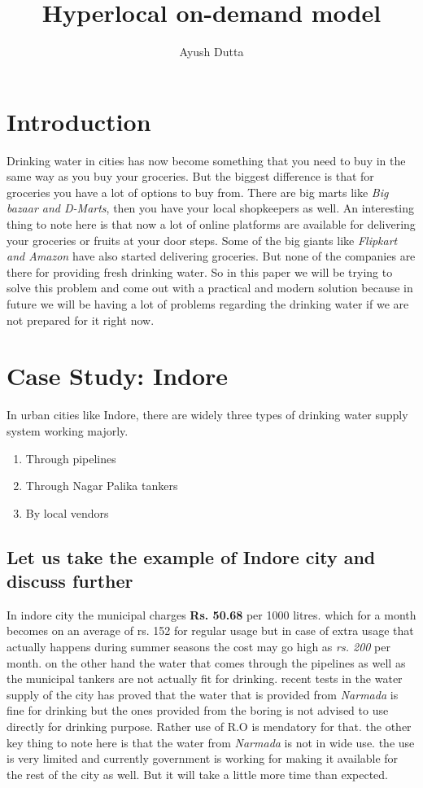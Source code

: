 \documentclass[a4paper, 12pt]{article}
\title{Hyperlocal on-demand model}
\author{Ayush Dutta}
\begin{document}
\maketitle

\section{Introduction}
Drinking water in cities has now become something that you need to buy in the same way as you buy your groceries. But the biggest difference is that for groceries you have a lot of options to buy from. There are big marts like
\textit{Big bazaar and D-Marts}, 
then you have your local shopkeepers as well. An interesting thing to note here is that now a lot of online platforms are available for delivering your groceries or fruits at your door steps. Some of the big giants like
\textit{Flipkart and Amazon} 
have also started delivering groceries. But none of the companies are there for providing fresh drinking water. So in this paper we will be trying to solve this problem and come out with a practical and modern solution because in future we will be having a lot of problems regarding the drinking water if we are not prepared for it right now.

\section{Case Study: Indore}
In urban cities like Indore, there are widely three types of drinking water supply system working majorly.
\begin{enumerate}
    \item Through pipelines
    \item Through Nagar Palika tankers
    \item By local vendors
\end{enumerate}

\subsection[short]{Let us take the example of Indore city and discuss further}
In indore city the municipal charges \textbf{Rs. 50.68} per 1000 litres. which for a month becomes on an average of rs. 152 for regular usage but in case of extra usage 
that actually happens during summer seasons the cost may go high as \textit{rs. 200} per month. on the other hand the water that comes through the pipelines as well as 
the municipal tankers are not actually fit for drinking. recent tests in the water supply of the city has proved that the water that is provided from \textit{Narmada} is 
fine for drinking but the ones provided from the boring is not advised to use directly for drinking purpose. Rather use of R.O is mendatory for that. the other key thing 
to note here is that the water from \textit{Narmada} is not in wide use. the use is very limited and currently government is working for making it available for the rest
of the city as well. But it will take a little more time than expected. 
\end{document}
